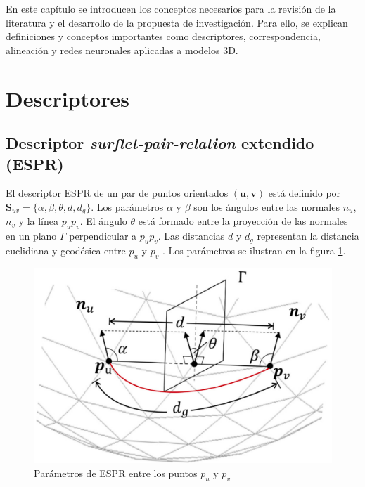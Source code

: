 
En este capítulo se introducen los conceptos necesarios para la revisión de la literatura y el desarrollo de la propuesta de investigación. Para ello, se explican definiciones y conceptos importantes como descriptores, correspondencia, alineación y redes neuronales aplicadas a modelos 3D.

\section{Descriptores}

\subsection{Descriptor \textit{surflet-pair-relation} extendido (ESPR)}
El descriptor ESPR de un par de puntos orientados $(\mathbf{u},\mathbf{v})$ está definido por $\mathbf{S}_{uv} = \{\alpha, \beta, \theta, d, d_g\}$. Los parámetros $\alpha$ y $\beta$ son los ángulos entre las normales $n_u$, $n_v$ y la línea $p_up_v$. El ángulo $\theta$ está formado entre la proyección de las normales en un plano $\Gamma$ perpendicular a $p_up_v$. Las distancias $d$ y $d_g$ representan la distancia euclidiana y geodésica entre $p_u$ y $p_v$ \cite{fn2}. Los parámetros se ilustran en la figura \ref{fig:espr}.

\begin{figure}[!h]
    \centering
    \includegraphics[scale=0.18]{images/espr.png}
    \caption{Parámetros de ESPR entre los puntos $p_u$ y $p_v$ \cite{5}}
    \label{fig:espr}
\end{figure}


